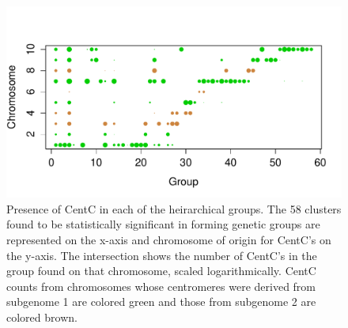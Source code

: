 \begin{figure}[h]
\centering
\includegraphics[width=1\textwidth]{Rplot02}
\caption{Presence of CentC in each of the heirarchical groups.  The 58 clusters found to be statistically significant in forming genetic groups are represented on the x-axis and chromosome of origin for CentC's on the y-axis. The intersection shows the number of CentC's in the group found on that chromosome, scaled logarithmically.  CentC counts from chromosomes whose centromeres were derived from subgenome 1 are colored green and those from subgenome 2 are colored brown. 
}
\label{pcoa}    
\end{figure}

